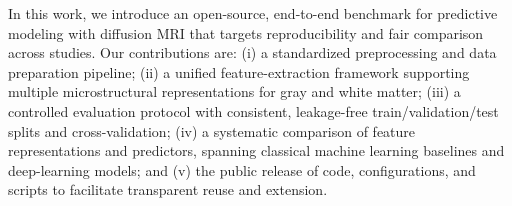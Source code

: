 In this work, we introduce an open-source, end-to-end benchmark for predictive modeling with 
diffusion MRI that targets reproducibility and fair comparison across studies. Our contributions 
are: (i) a standardized preprocessing and data preparation pipeline; (ii) a unified feature-extraction 
framework supporting multiple microstructural representations for gray and white matter; (iii) a 
controlled evaluation protocol with consistent, leakage-free train/validation/test splits and 
cross-validation; (iv) a systematic comparison of feature representations and predictors, spanning 
classical machine learning baselines and deep-learning models; and (v) the public release of code, 
configurations, and scripts to facilitate transparent reuse and extension.
